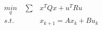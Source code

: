 \documentclass[preview]{standalone}
\begin{document}
\begin{align*}
\underset{q}{min}  \quad \sum &x^TQx + u^T R u \\ s.t. \quad &x_{k+1} = Ax_k + Bu_k
\end{align*}
\end{document}
